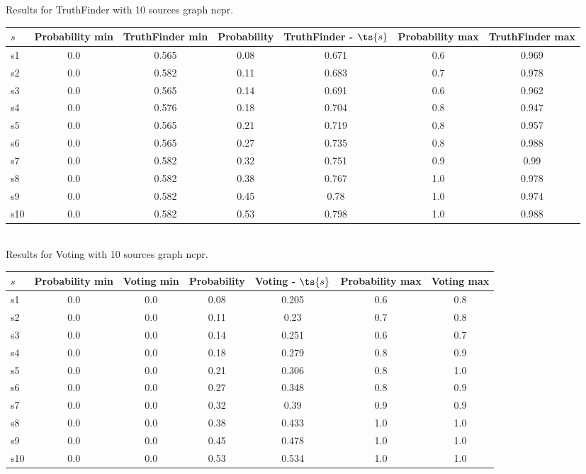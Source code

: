 \documentclass{article}
\begin{document}
\noindent Results for TruthFinder with 10 sources graph ncpr.

\noindent\begin{tabular}{|l|c|c|c|c|c|c|}
\hline
$s$& Probability min & TruthFinder min & Probability & TruthFinder - $\ts{s}$ & Probability max & TruthFinder max\\
\hline
s1 &0.0 & 0.565 & 0.08 & 0.671 & 0.6 & 0.969\\
\hline
s2 &0.0 & 0.582 & 0.11 & 0.683 & 0.7 & 0.978\\
\hline
s3 &0.0 & 0.565 & 0.14 & 0.691 & 0.6 & 0.962\\
\hline
s4 &0.0 & 0.576 & 0.18 & 0.704 & 0.8 & 0.947\\
\hline
s5 &0.0 & 0.565 & 0.21 & 0.719 & 0.8 & 0.957\\
\hline
s6 &0.0 & 0.565 & 0.27 & 0.735 & 0.8 & 0.988\\
\hline
s7 &0.0 & 0.582 & 0.32 & 0.751 & 0.9 & 0.99\\
\hline
s8 &0.0 & 0.582 & 0.38 & 0.767 & 1.0 & 0.978\\
\hline
s9 &0.0 & 0.582 & 0.45 & 0.78 & 1.0 & 0.974\\
\hline
s10 &0.0 & 0.582 & 0.53 & 0.798 & 1.0 & 0.988\\
\hline
\end{tabular}\\

\noindent Results for Voting with 10 sources graph ncpr.

\noindent\begin{tabular}{|l|c|c|c|c|c|c|}
\hline
$s$& Probability min & Voting min & Probability & Voting - $\ts{s}$ & Probability max & Voting max\\
\hline
s1 &0.0 & 0.0 & 0.08 & 0.205 & 0.6 & 0.8\\
\hline
s2 &0.0 & 0.0 & 0.11 & 0.23 & 0.7 & 0.8\\
\hline
s3 &0.0 & 0.0 & 0.14 & 0.251 & 0.6 & 0.7\\
\hline
s4 &0.0 & 0.0 & 0.18 & 0.279 & 0.8 & 0.9\\
\hline
s5 &0.0 & 0.0 & 0.21 & 0.306 & 0.8 & 1.0\\
\hline
s6 &0.0 & 0.0 & 0.27 & 0.348 & 0.8 & 0.9\\
\hline
s7 &0.0 & 0.0 & 0.32 & 0.39 & 0.9 & 0.9\\
\hline
s8 &0.0 & 0.0 & 0.38 & 0.433 & 1.0 & 1.0\\
\hline
s9 &0.0 & 0.0 & 0.45 & 0.478 & 1.0 & 1.0\\
\hline
s10 &0.0 & 0.0 & 0.53 & 0.534 & 1.0 & 1.0\\
\hline
\end{tabular}\\
\end{document}
